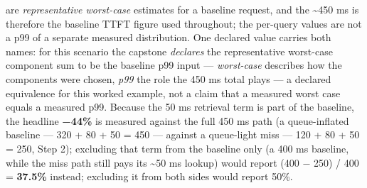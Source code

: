are \emph{representative worst-case} estimates for a baseline request,
and the \textasciitilde450 ms is therefore the baseline TTFT figure used
throughout; the per-query values are not a p99 of a separate measured
distribution. One declared value carries both names: for this scenario
the capstone \emph{declares} the representative worst-case component sum
to be the baseline p99 input --- \emph{worst-case} describes how the
components were chosen, \emph{p99} the role the 450 ms total plays --- a
declared equivalence for this worked example, not a claim that a
measured worst case equals a measured p99. Because the 50 ms retrieval
term is part of the baseline, the headline \textbf{−44\%} is measured
against the full 450 ms path (a queue-inflated baseline --- 320 + 80 +
50 = 450 --- against a queue-light miss --- 120 + 80 + 50 = 250, Step
2); excluding that term from the baseline only (a 400 ms baseline, while
the miss path still pays its \textasciitilde50 ms lookup) would report
(400 − 250) / 400 = \textbf{37.5\%} instead; excluding it from both
sides would report 50\%.

